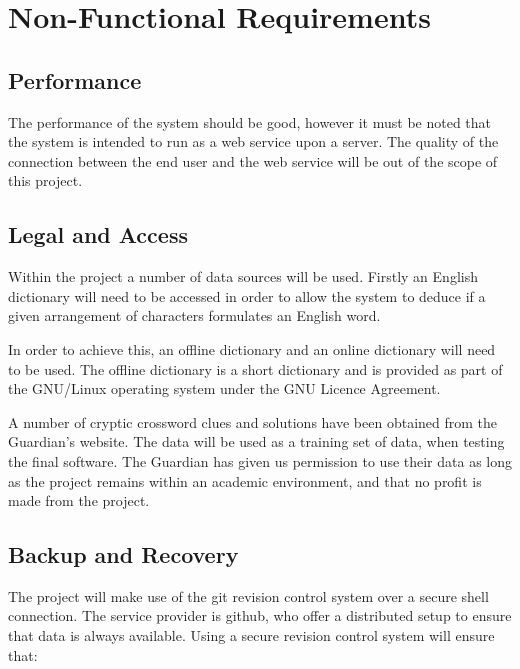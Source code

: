 \section{Non-Functional Requirements}


\subsection{Performance}

The performance of the system should be good, however it must be noted that the
system is intended to run as a web service upon a server. The quality of the 
connection between the end user and the web service will be out of the scope of
this project.


\subsection{Legal and Access}

Within the project a number of data sources will be used. Firstly an English
dictionary will need to be accessed in order to allow the system to deduce if a 
given arrangement of characters formulates an English word.

In order to achieve this, an offline dictionary and an online dictionary will
need to be used. The offline dictionary is a short dictionary and is provided as
part of the GNU/Linux operating system under the GNU Licence Agreement.

A number of cryptic crossword clues and solutions have been obtained from the
Guardian's website. The data will be used as a training set of data, when
testing the final software. The Guardian has given us permission to use their
data as long as the project remains within an academic environment, and that no
profit is made from the project.


\subsection{Backup and Recovery}

The project will make use of the git revision control system over a secure shell 
connection. The service provider is github, who offer a distributed setup to 
ensure that data is always available. Using a secure revision control system 
will ensure that:


